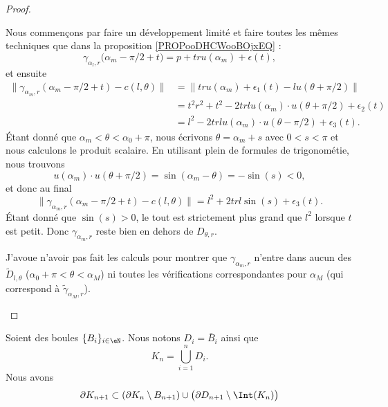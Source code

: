 \begin{proof}
\begin{subproof}
		Nous commençons par faire un développement limité et faire toutes les mêmes techniques que dans la proposition \ref{PROPooDHCWooBOjxEQ} :
		\begin{equation}
			\gamma_{\alpha_l,r}\big( \alpha_m-\pi/2+t \big)=p+tru(\alpha_m)+\epsilon(t),
		\end{equation}
		et ensuite
		\begin{subequations}
			\begin{align}
				\| \gamma_{\alpha_m,r}(\alpha_m-\pi/2+t)-c(l,\theta) \| & =\| tru(\alpha_m)+\epsilon_1(t)-lu(\theta+\pi/2) \|            \\
				                                                        & =t^2r^2+t^2-2trlu(\alpha_m)\cdot u(\theta+\pi/2)+\epsilon_2(t) \\
				                                                        & =l^2-2trlu(\alpha_m)\cdot u(\theta-\pi/2)+\epsilon_3(t).
			\end{align}
		\end{subequations}
		Étant donné que \( \alpha_m<\theta<\alpha_0+\pi\), nous écrivons \( \theta=\alpha_m+s\) avec \( 0<s<\pi\) et nous calculons le produit scalaire. En utilisant plein de formules de trigonométie, nous trouvons
		\begin{equation}
			u(\alpha_m)\cdot u(\theta+\pi/2)=\sin(\alpha_m-\theta)=-\sin(s)<0,
		\end{equation}
		et donc au final
		\begin{equation}
			\| \gamma_{\alpha_m,r}(\alpha_m-\pi/2+t)-c(l,\theta) \|=l^2+2trl\sin(s)+\epsilon_3(t).
		\end{equation}
		Étant donné que \( \sin(s)>0\), le tout est strictement plus grand que \( l^2\) lorsque \( t\) est petit. Donc \( \gamma_{\alpha_m,r}\) reste bien en dehors de \( D_{\theta,r}\).

		J'avoue n'avoir pas fait les calculs pour montrer que \( \gamma_{\alpha_m,r}\) n'entre dans aucun des \( \tilde D_{l,\theta}\) (\( \alpha_0+\pi<\theta<\alpha_M\)) ni toutes les vérifications correspondantes pour \( \alpha_M\) (qui correspond à \( \tilde \gamma_{\alpha_M,r}\)).
	\end{subproof}
\end{proof}

\begin{proposition}	\label{PROPooCMQHooGFlsiq}
	Soient des boules \( \{ B_i \}_{i\in \eN}\). Nous notons \( D_i=\bar B_i\) ainsi que
	\begin{equation}
		K_n=\bigcup_{i=1}^nD_i.
	\end{equation}
	Nous avons
	\begin{equation}
		\partial K_{n+1}\subset(\partial K_n\setminus B_{n+1})\cup\big(\partial D_{n+1}\setminus\Int(K_n)\big)
	\end{equation}
\end{proposition}

